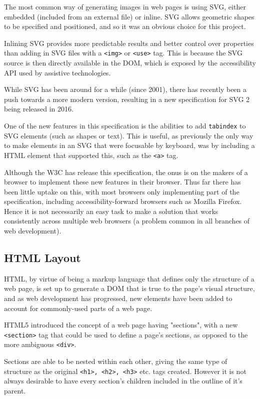 \documentclass[ %
                    author={Aleena Baig},
                supervisor={Dr Simon Lock},
                    degree={BSc},
                     title={On Making Web Accessible Graphs},
                  subtitle={},
                      year={2019} ]{dissertation}
\begin{document}
The most common way of generating images in web pages is using SVG, either embedded (included from an external file) or inline. SVG allows geometric shapes to be specified and positioned, and so it was an obvious choice for this project.

Inlining SVG provides more predictable results and better control over properties than adding in SVG files with a \texttt{<img>} or \texttt{<use>} tag. This is because the SVG source is then directly available in the DOM, which is exposed by the accessibility API used by assistive technologies.

While SVG has been around for a while (since 2001), there has recently been a push towards a more modern version, resulting in a new specification for SVG 2 being released in 2016.

One of the new features in this specification is the abilities to add \texttt{tabindex} to SVG elements (such as shapes or text). This is useful, as previously the only way to make elements in an SVG that were focusable by keyboard, was by including a HTML element that supported this, such as the \texttt{<a>} tag.

Although the W3C has release this specification, the onus is on the makers of a browser to implement these new features in their browser. Thus far there has been little uptake on this, with most browsers only implementing part of the specification, including accessibility-forward browsers such as Mozilla Firefox. Hence it is not necessarily an easy task to make a solution that works consistently across multiple web browsers (a problem common in all branches of web development).

\subsection{HTML Layout}

HTML, by virtue of being a markup language that defines only the structure of a web page, is set up to generate a DOM that is true to the page's visual structure, and as web development has progressed, new elements have been added to account for commonly-used parts of a web page.

HTML5 introduced the concept of a web page having "sections", with a new \texttt{<section>} tag that could be used to define a page's sections, as opposed to the more ambiguous \texttt{<div>}.

Sections are able to be nested within each other, giving the same type of structure as the original \texttt{<h1>, <h2>, <h3>} etc. tags created. However it is not always desirable to have every section's children included in the outline of it's parent.
\end{document}
